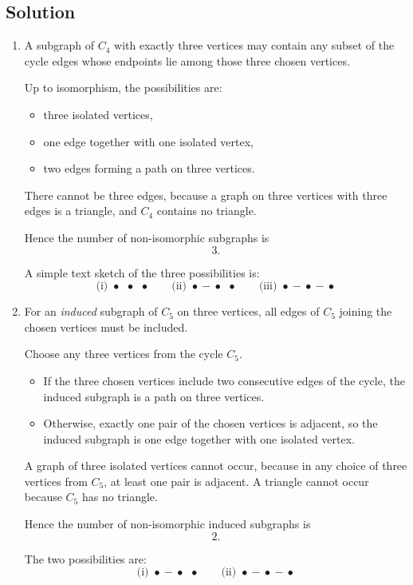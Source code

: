\documentclass[12pt]{article}
\begin{document}
\subsection{Solution}

\begin{enumerate}[label=(\alph*)]
    \item A subgraph of $C_4$ with exactly three vertices may contain any subset of the cycle edges whose endpoints lie among those three chosen vertices.

    Up to isomorphism, the possibilities are:

    \begin{itemize}
        \item three isolated vertices,
        \item one edge together with one isolated vertex,
        \item two edges forming a path on three vertices.
    \end{itemize}

    There cannot be three edges, because a graph on three vertices with three edges is a triangle, and $C_4$ contains no triangle.

    Hence the number of non-isomorphic subgraphs is
    \[
    \boxed{3}.
    \]

    A simple text sketch of the three possibilities is:
    \[
    \text{(i) } \bullet\ \ \bullet\ \ \bullet
    \qquad
    \text{(ii) } \bullet\! -\! \bullet\ \ \bullet
    \qquad
    \text{(iii) } \bullet\! -\! \bullet\! -\! \bullet
    \]

    \item For an \emph{induced} subgraph of $C_5$ on three vertices, all edges of $C_5$ joining the chosen vertices must be included.

    Choose any three vertices from the cycle $C_5$.

    \begin{itemize}
        \item If the three chosen vertices include two consecutive edges of the cycle, the induced subgraph is a path on three vertices.
        \item Otherwise, exactly one pair of the chosen vertices is adjacent, so the induced subgraph is one edge together with one isolated vertex.
    \end{itemize}

    A graph of three isolated vertices cannot occur, because in any choice of three vertices from $C_5$, at least one pair is adjacent. A triangle cannot occur because $C_5$ has no triangle.

    Hence the number of non-isomorphic induced subgraphs is
    \[
    \boxed{2}.
    \]

    The two possibilities are:
    \[
    \text{(i) } \bullet\! -\! \bullet\ \ \bullet
    \qquad
    \text{(ii) } \bullet\! -\! \bullet\! -\! \bullet
    \]
\end{enumerate}
\end{document}
